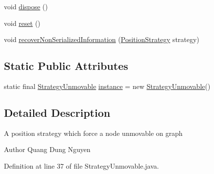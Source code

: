 \begin{DoxyCompactItemize}
\item 
void \hyperlink{classorg_1_1tzi_1_1use_1_1gui_1_1views_1_1diagrams_1_1elements_1_1positioning_1_1_strategy_unmovable_aa64f02d8f7402e95362033c71712314f}{dispose} ()
\item 
void \hyperlink{classorg_1_1tzi_1_1use_1_1gui_1_1views_1_1diagrams_1_1elements_1_1positioning_1_1_strategy_unmovable_aa0a814fd77a435b005daa9aa2ad35178}{reset} ()
\item 
void \hyperlink{classorg_1_1tzi_1_1use_1_1gui_1_1views_1_1diagrams_1_1elements_1_1positioning_1_1_strategy_unmovable_ac1f5faee6060891495a09ae26810508b}{recover\-Non\-Serialized\-Information} (\hyperlink{interfaceorg_1_1tzi_1_1use_1_1gui_1_1views_1_1diagrams_1_1elements_1_1positioning_1_1_position_strategy}{Position\-Strategy} strategy)
\end{DoxyCompactItemize}
\subsection*{Static Public Attributes}
\begin{DoxyCompactItemize}
\item 
static final \hyperlink{classorg_1_1tzi_1_1use_1_1gui_1_1views_1_1diagrams_1_1elements_1_1positioning_1_1_strategy_unmovable}{Strategy\-Unmovable} \hyperlink{classorg_1_1tzi_1_1use_1_1gui_1_1views_1_1diagrams_1_1elements_1_1positioning_1_1_strategy_unmovable_a345fe0509be11915fa6f6de9f589c865}{instance} = new \hyperlink{classorg_1_1tzi_1_1use_1_1gui_1_1views_1_1diagrams_1_1elements_1_1positioning_1_1_strategy_unmovable}{Strategy\-Unmovable}()
\end{DoxyCompactItemize}


\subsection{Detailed Description}
A position strategy which force a node unmovable on graph

\begin{DoxyAuthor}{Author}
Quang Dung Nguyen 
\end{DoxyAuthor}


Definition at line 37 of file Strategy\-Unmovable.\-java.




